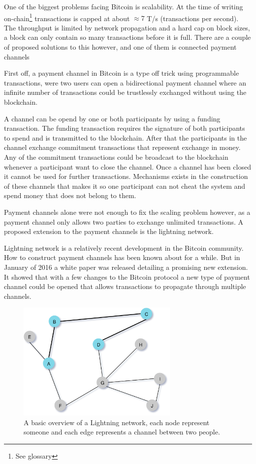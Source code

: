 
One of the biggest problems facing Bitcoin is scalability. At the time of writing
on-chain\footnote{See glossary} transactions is capped at about $\approx 7$ T/s (transactions per second).\cite{scaling}
The throughput is limited by network propagation and a hard cap on block sizes, a block
can only contain so many transactions before it is full. There are a couple of
proposed solutions to this however, and one of them is connected payment channels

First off, a payment channel in Bitcoin is a type off trick using programmable transactions, 
were two users can open a bidirectional payment channel where an infinite number of transactions 
could be trustlessly exchanged without using the blockchain. 

A channel can be opend by one or both participants by using a funding transaction. The funding 
transaction requires the signature of both participants to spend and is transmitted to the blockchain. 
After that the participants in the channel exchange commitment transactions that represent exchange in money.
Any of the commitment transactions could be broadcast to the blockchain whenever a participant 
want to close the channel. Once a channel has been closed it cannot be used for further transactions.
Mechanisms exists in the construction of these channels that makes it so one participant 
can not cheat the system and spend money that does not belong to them.

Payment channels alone were not enough to fix the scaling problem however, as a payment channel 
only allows two parties to exchange unlimited transactions. A proposed extension to the 
payment channels is the lightning network.

Lightning network is a relatively recent development in the Bitcoin community.
How to construct payment channels has been known about for a while. But in
January of 2016 a white paper was released detailing a promising new extension.\cite{lightningnetwork_2019}
It showed that with a few changes to the Bitcoin protocol a new type of
payment channel could be opened that allows transactions to propagate through multiple channels.\cite{lightningnetwork_2019}

\begin{figure}[H]
	\centering
	\includegraphics[width=0.70\textwidth]{introduction/images/mesh_network.png}
	\caption{A basic overview of a Lightning network, each node represent someone
	and each edge represents a channel between two people.}
	\label{fig:mesh}
\end{figure}

